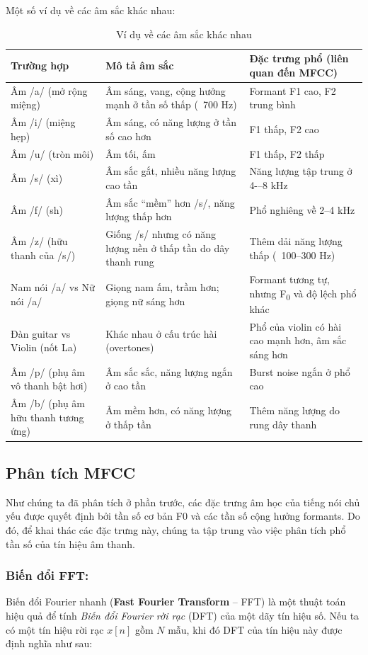 Một số ví dụ về các âm sắc khác nhau:
\begin{table}[!htp]
\centering
\caption{Ví dụ về các âm sắc khác nhau}
\begin{tabular}{|l|p{4cm}|p{6cm}|}
\hline
\textbf{Trường hợp} & \textbf{Mô tả âm sắc} & \textbf{Đặc trưng phổ (liên quan đến MFCC)} \\ \hline
Âm /a/ (mở rộng miệng) & Âm sáng, vang, cộng hưởng mạnh ở tần số thấp (~700 Hz) & Formant F1 cao, F2 trung bình \\ \hline
Âm /i/ (miệng hẹp) & Âm sáng, có năng lượng ở tần số cao hơn & F1 thấp, F2 cao \\ \hline
Âm /u/ (tròn môi) & Âm tối, ấm & F1 thấp, F2 thấp \\ \hline
Âm /s/ (xì) & Âm sắc gắt, nhiều năng lượng cao tần & Năng lượng tập trung ở 4-–8 kHz \\ \hline
Âm /f/ (sh) & Âm sắc “mềm” hơn /s/, năng lượng thấp hơn & Phổ nghiêng về 2--4 kHz \\ \hline
Âm /z/ (hữu thanh của /s/) & Giống /s/ nhưng có năng lượng nền ở thấp tần do dây thanh rung & Thêm dải năng lượng thấp (~100–300 Hz) \\ \hline
Nam nói /a/ vs Nữ nói /a/ & Giọng nam ấm, trầm hơn; giọng nữ sáng hơn & Formant tương tự, nhưng F\textsubscript{0} và độ lệch phổ khác \\ \hline
Đàn guitar vs Violin (nốt La) & Khác nhau ở cấu trúc hài (overtones) & Phổ của violin có hài cao mạnh hơn, âm sắc sáng hơn \\ \hline
Âm /p/ (phụ âm vô thanh bật hơi) & Âm sắc sắc, năng lượng ngắn ở cao tần & Burst noise ngắn ở phổ cao \\ \hline
Âm /b/ (phụ âm hữu thanh tương ứng) & Âm mềm hơn, có năng lượng ở thấp tần & Thêm năng lượng do rung dây thanh \\ \hline
\end{tabular}
\end{table}
\newpage
\subsection{Phân tích MFCC}
Như chúng ta đã phân tích ở phần trước, các đặc trưng âm học của tiếng nói chủ yếu được quyết định bởi tần số cơ bản F0 và các tần số cộng hưởng formants. 
Do đó, để khai thác các đặc trưng này, chúng ta tập trung vào việc phân tích phổ tần số của tín hiệu âm thanh.
\subsubsection{Biến đổi FFT:}
Biến đổi Fourier nhanh (\textbf{Fast Fourier Transform} -- FFT) là một thuật toán hiệu quả để tính \textit{Biến đổi Fourier rời rạc} (DFT) của một dãy tín hiệu số.  
Nếu ta có một tín hiệu rời rạc $x[n]$ gồm $N$ mẫu, khi đó DFT của tín hiệu này được định nghĩa như sau:


